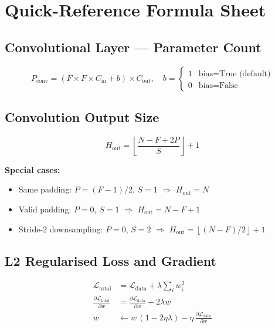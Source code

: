 \documentclass[12pt,a4paper]{article}
\newcommand{\Cin}{C_{\mathrm{in}}}
\newcommand{\Cout}{C_{\mathrm{out}}}
\newcommand{\Ltotal}{\mathcal{L}_{\mathrm{total}}}
\newcommand{\Ldata}{\mathcal{L}_{\mathrm{data}}}
\newcommand{\floor}[1]{\left\lfloor #1 \right\rfloor}
\begin{document}
\appendix

\section{Quick-Reference Formula Sheet}
\label{app:formulas}

\subsection*{Convolutional Layer --- Parameter Count}
\[
  P_{\mathrm{conv}} = (F \times F \times \Cin + b) \times \Cout,
  \quad b = \begin{cases}1 & \text{bias=True (default)}\\0 & \text{bias=False}\end{cases}
\]

\subsection*{Convolution Output Size}
\[
  H_{\mathrm{out}} = \floor{\frac{N - F + 2P}{S}} + 1
\]

\textbf{Special cases:}
\begin{itemize}[noitemsep]
  \item Same padding: $P = (F-1)/2$, $S=1$ $\Rightarrow$ $H_{\mathrm{out}} = N$
  \item Valid padding: $P=0$, $S=1$ $\Rightarrow$ $H_{\mathrm{out}} = N - F + 1$
  \item Stride-2 downsampling: $P=0$, $S=2$ $\Rightarrow$
        $H_{\mathrm{out}} = \floor{(N-F)/2} + 1$
\end{itemize}

\subsection*{L2 Regularised Loss and Gradient}
\begin{align*}
  \Ltotal &= \Ldata + \lambda \sum_i w_i^2 \\
  \frac{\partial \Ltotal}{\partial w} &= \frac{\partial \Ldata}{\partial w} + 2\lambda w \\
  w &\leftarrow w\,(1 - 2\eta\lambda)
    - \eta\,\frac{\partial \Ldata}{\partial w}
\end{align*}
\end{document}

